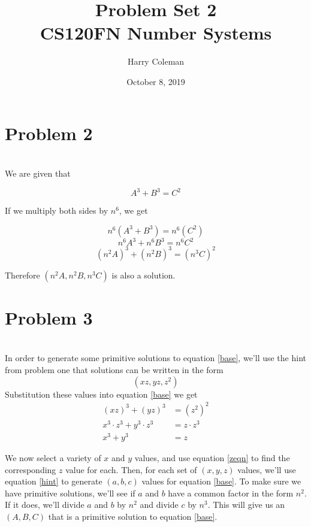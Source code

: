 \documentclass[12pt]{article}
\begin{document}
 
\title{Problem Set 2\\
    \large CS120FN Number Systems}
\author{Harry Coleman}
\date{October 8, 2019}

\maketitle

\section*{Problem 2}
\\

We are given that

\begin{equation}\label{base}
    A^3 + B^3 = C^2
\end{equation}

If we multiply both sides by $n^6$, we get

\[n^6(A^3 + B^3) = n^6(C^2)\]
\[n^6 A^3 + n^6 B^3 = n^6 C^2\]
\[(n^2 A)^3 + (n^2 B)^3 = (n^3 C)^2\]

Therefore $(n^2A,n^2B,n^3C)$ is also a solution.

\newpage
\section*{Problem 3}
\\

In order to generate some primitive solutions to equation \ref{base}, we'll use the hint from problem one that solutions can be written in the form 
\begin{equation}\label{hint}
    (xz, yz, z^2)
\end{equation} 
Substitution these values into equation \ref{base} we get
\begin{align}
    \nonumber (xz)^3 + (yz)^3 &= (z^2)^2\\
    \nonumber x^3 \cdot z^3 + y^3 \cdot z^3 &= z \cdot z^3\\
    x^3 + y^3 &= z \label{zeqn}
\end{align}

We now select a variety of $x$ and $y$ values, and use equation \ref{zeqn} to find the corresponding $z$ value for each. Then, for each set of $(x, y, z)$ values, we'll use equation \ref{hint} to generate $(a, b, c)$ values for equation \ref{base}. To make sure we have primitive solutions, we'll see if $a$ and $b$ have a common factor in the form $n^2$. If it does, we'll divide $a$ and $b$ by $n^2$ and divide $c$ by $n^3$. This will give us an $(A, B, C)$ that is a primitive solution to equation \ref{base}. 
\end{document}
